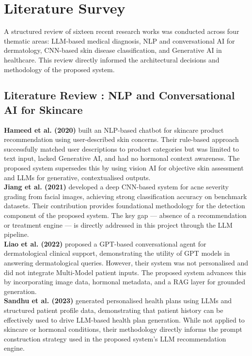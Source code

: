 \section{Literature Survey}
\hspace*{0.5in}A structured review of sixteen recent research works was conducted across four thematic areas: LLM-based medical diagnosis, NLP and conversational AI for dermatology, CNN-based skin disease classification, and Generative AI in healthcare. This review directly informed the architectural decisions and methodology of the proposed system.\\

\subsection*{Literature Review : NLP and Conversational AI for Skincare}

\hspace*{0.3in}\textbf{Hameed et al. (2020)} built an NLP-based chatbot for skincare product recommendation using user-described skin concerns. Their rule-based approach successfully matched user descriptions to product categories but was limited to text input, lacked Generative AI, and had no hormonal context awareness. The proposed system supersedes this by using vision AI for objective skin assessment and LLMs for generative, contextualised outputs.\\

\hspace*{0.3in}\textbf{Jiang et al. (2021)} developed a deep CNN-based system for acne severity grading from facial images, achieving strong classification accuracy on benchmark datasets. Their contribution provides foundational methodology for the detection component of the proposed system. The key gap — absence of a recommendation or treatment engine — is directly addressed in this project through the LLM pipeline.\\

\hspace*{0.3in}\textbf{Liao et al. (2022)} proposed a GPT-based conversational agent for dermatological clinical support, demonstrating the utility of GPT models in answering dermatological queries. However, their system was not personalised and did not integrate Multi-Model patient inputs. The proposed system advances this by incorporating image data, hormonal metadata, and a RAG layer for grounded generation.\\

\hspace*{0.3in}\textbf{Sandhu et al. (2023)} generated personalised health plans using LLMs and structured patient profile data, demonstrating that patient history can be effectively used to drive LLM-based health plan generation. While not applied to skincare or hormonal conditions, their methodology directly informs the prompt construction strategy used in the proposed system's LLM recommendation engine.\\

